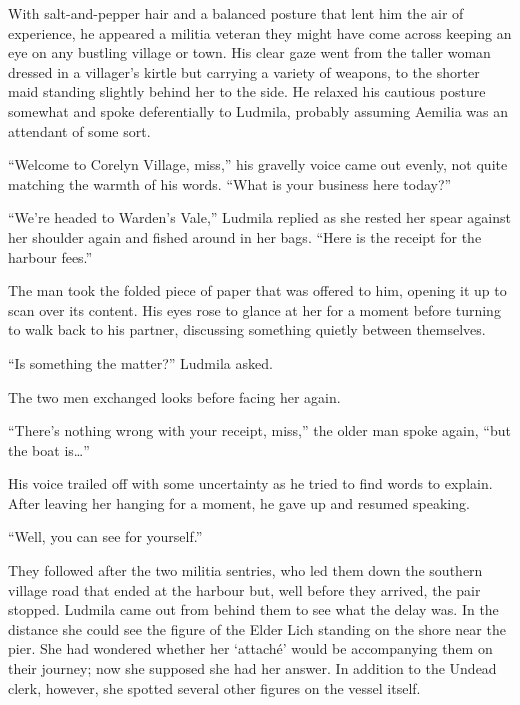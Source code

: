 With salt-and-pepper hair and a balanced posture that lent him the air of experience, he appeared a militia veteran they might have come across keeping an eye on any bustling village or town. His clear gaze went from the taller woman dressed in a villager’s kirtle but carrying a variety of weapons, to the shorter maid standing slightly behind her to the side. He relaxed his cautious posture somewhat and spoke deferentially to Ludmila, probably assuming Aemilia was an attendant of some sort.

 

“Welcome to Corelyn Village, miss,” his gravelly voice came out evenly, not quite matching the warmth of his words. “What is your business here today?”

 

“We’re headed to Warden’s Vale,” Ludmila replied as she rested her spear against her shoulder again and fished around in her bags. “Here is the receipt for the harbour fees.”

 

The man took the folded piece of paper that was offered to him, opening it up to scan over its content. His eyes rose to glance at her for a moment before turning to walk back to his partner, discussing something quietly between themselves.

 

“Is something the matter?” Ludmila asked.

 

The two men exchanged looks before facing her again.

 

“There’s nothing wrong with your receipt, miss,” the older man spoke again, “but the boat is…”

 

His voice trailed off with some uncertainty as he tried to find words to explain. After leaving her hanging for a moment, he gave up and resumed speaking.

 

“Well, you can see for yourself.”

 

They followed after the two militia sentries, who led them down the southern village road that ended at the harbour but, well before they arrived, the pair stopped. Ludmila came out from behind them to see what the delay was. In the distance she could see the figure of the Elder Lich standing on the shore near the pier. She had wondered whether her ‘attaché’ would be accompanying them on their journey; now she supposed she had her answer. In addition to the Undead clerk, however, she spotted several other figures on the vessel itself.

